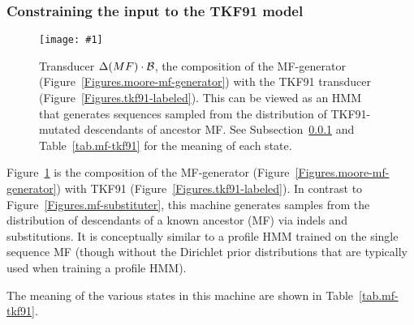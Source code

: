 \documentclass{article}
\newcommand{\secref}[1]{Subsection~\ref{sec.#1}}
\newcommand{\seclabel}[1]{\label{sec.#1}}
\newcommand{\tabnum}[1]{\ref{tab.#1}}
\newcommand{\tabref}[1]{Table~\tabnum{#1}}
\newcommand{\figref}[1]{Figure~\ref{Figures.#1}}
\newcommand{\figlabel}[1]{\label{Figures.#1}}
\newcommand{\easyfig}[4]{
\begin{figure}
\texttt{[image: \#1]}
\caption{ \figlabel{#3} #4}
\end{figure}}
\newcommand{\widepdffig}[2]{\easyfig{#1-fig.pdf}{width=\textwidth}{#1}{#2}}
\newcommand\tkf{{\cal B}}
\newcommand\generate{\Delta}
\begin{document}
\subsubsection{Constraining the input to the TKF91 model}
\seclabel{mf-tkf91}
\widepdffig{mf-tkf91}{Transducer $\generate(MF) \cdot \tkf$, the composition of the MF-generator (\figref{moore-mf-generator}) with the TKF91 transducer (\figref{tkf91-labeled}).
This can be viewed as an HMM that generates sequences sampled from the distribution of TKF91-mutated descendants of ancestor MF.
See \secref{mf-tkf91} and \tabref{mf-tkf91} for the meaning of each state. }

\figref{mf-tkf91} is the composition of the MF-generator (\figref{moore-mf-generator}) with TKF91 (\figref{tkf91-labeled}).  
In contrast to \figref{mf-substituter}, this machine generates samples
from the distribution of descendants of a known ancestor (MF) via indels and substitutions.  It is conceptually similar to a profile HMM
trained on the single sequence MF (though without the Dirichlet prior distributions that are typically used when training a profile HMM).

The meaning of the various states in this machine are shown in \tabref{mf-tkf91}.
\end{document}
